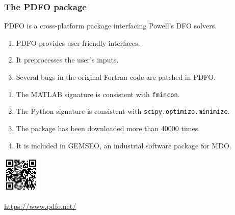 \documentclass{polyu-presentation}
\begin{document}
\begin{frame}
    \frametitle{The PDFO package}

    \begin{block}{}
        \alert{PDFO} is a \alert{cross-platform} package interfacing Powell's DFO solvers.
        \begin{enumerate}
            \item PDFO provides \alert{user-friendly} interfaces.
            \item It \alert{preprocesses} the user's inputs.
            \item Several \alert{bugs} in the original Fortran code are \alert{patched} in PDFO.
        \end{enumerate}
    \end{block}

    \begin{enumerate}
        \item The \alert{MATLAB} signature is consistent with \texttt{fmincon}.
        \item The \alert{Python} signature is consistent with \texttt{scipy.optimize.minimize}.
        \item The package has been downloaded more than \alert{\num{40000} times}.
        \item It is included in GEMSEO, an \alert{industrial} software package for MDO.
    \end{enumerate}

    \smallskip
    
	\begin{center}
        \href{https://www.pdfo.net/}{\includegraphics[width=0.7in]{images/qr/pdfo.png}}

        \scriptsize\url{https://www.pdfo.net/}
    \end{center}
\end{frame}
\end{document}
